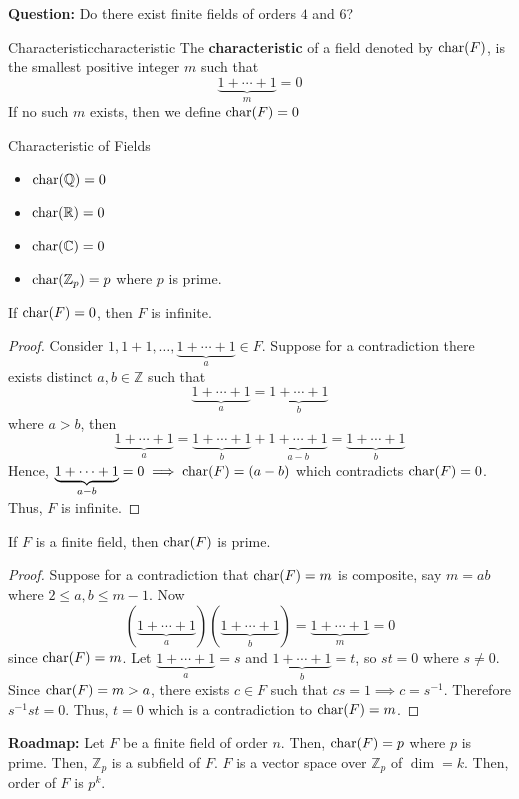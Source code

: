 \textbf{Question:} Do there exist finite fields of orders $ 4 $ and $ 6 $?

\begin{Definition}{Characteristic}{characteristic}
    The \textbf{characteristic} of a field denoted by $ \operatorname{char}(F) $, is the smallest
    positive integer $ m $ such that
    \[ \underbrace{1+\cdots+1}_{m}=0 \]
    If no such $ m $ exists, then we define $ \operatorname{char}(F)=0 $
\end{Definition}

\begin{Example}{Characteristic of Fields}{}
    \begin{itemize}
        \item $ \operatorname{char}(\mathbb{Q})=0 $
        \item $ \operatorname{char}(\mathbb{R})=0 $
        \item $ \operatorname{char}(\mathbb{C})=0 $
        \item $ \operatorname{char}(\mathbb{Z}_p)=p $ where $ p $ is prime.
    \end{itemize}
\end{Example}

\begin{Theorem}{}{}
    If $ \operatorname{char}(F)=0 $, then $ F $ is infinite.
\end{Theorem}

\begin{proof}
    Consider $ 1,1+1,\ldots,\underbrace{1+\cdots+1}_{a}\in F $.
    Suppose for a contradiction there exists distinct $ a,b\in\mathbb{Z} $
    such that
    \[ \underbrace{1+\cdots+1}_{a}=\underbrace{1+\cdots+1}_{b} \]
    where $ a>b $, then
    \[ \underbrace{1+\cdots+1}_{a}=\underbrace{1+\cdots+1}_{b}+
        \underbrace{1+\cdots+1}_{a-b}=\underbrace{1+\cdots+1}_{b} \]
    Hence, $ \underbrace{1+\cdots+1}_{a-b}=0\implies \operatorname{char}(F)=(a-b) $
    which contradicts $ \operatorname{char}(F)=0 $. Thus, $ F $ is infinite.
\end{proof}

\begin{Theorem}{}{}
    If $ F $ is a finite field, then $ \operatorname{char}(F) $ is prime.
\end{Theorem}

\begin{proof}
    Suppose for a contradiction that $ \operatorname{char}(F)=m $ is composite,
    say $ m=ab $ where
    $ 2\leqslant a,b\leqslant m-1 $. Now
    \[ (\underbrace{1+\cdots+1}_{a})(\underbrace{1+\cdots+1}_{b})
        =\underbrace{1+\cdots+1}_{m}=0 \]
    since $ \operatorname{char}(F)=m $. Let $ \underbrace{1+\cdots+1}_{a}=s $
    and $ \underbrace{1+\cdots+1}_{b}=t $, so $ st=0 $ where $ s\neq 0 $.
    Since $ \operatorname{char}(F)=m>a $, there exists $ c\in F $ such that
    $ cs=1 \implies c=s^{-1} $. Therefore $ s^{-1}st=0 $. Thus,
    $ t=0 $ which is a contradiction to $ \operatorname{char}(F)=m $.
\end{proof}

\textbf{Roadmap:} Let $ F $ be a finite field of order $ n $.
Then, $ \operatorname{char}(F)=p $ where $ p $ is prime. Then, $ \mathbb{Z}_p $ is a subfield
of $ F $. $ F $ is a vector space over $ \mathbb{Z}_p $ of $ \dim=k $.
Then, order of $ F $ is $ p^k $.
